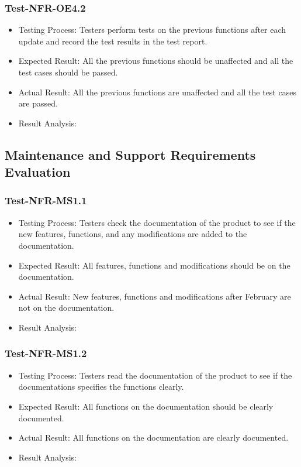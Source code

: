 \documentclass[12pt, titlepage]{article}
\begin{document}
\subsubsection{Test-NFR-OE4.2}
\begin{itemize}
    \item Testing Process: Testers perform tests on the previous functions after each update and record the test results in the test report.
    \item Expected Result: All the previous functions should be unaffected and all the test cases should be passed.
    \item Actual Result: All the previous functions are unaffected and all the test cases are passed.
    \item Result Analysis: \pass
\end{itemize}

\subsection{Maintenance and Support Requirements Evaluation}
\subsubsection{Test-NFR-MS1.1}
\begin{itemize}
    \item Testing Process: Testers check the documentation of the product to see if the new features, functions, and any modifications are added to the documentation. 
    \item Expected Result: All features, functions and modifications should be on the documentation.
    \item Actual Result: New features, functions and modifications after February are not on the documentation.
    \item Result Analysis: \fail

\end{itemize}

\subsubsection{Test-NFR-MS1.2}
\begin{itemize}
    \item Testing Process: Testers read the documentation of the product to see if the documentations specifies the functions clearly.
    \item Expected Result: All functions on the documentation should be clearly documented.
    \item Actual Result: All functions on the documentation are clearly documented.
    \item Result Analysis: \pass
\end{itemize}
\end{document}
